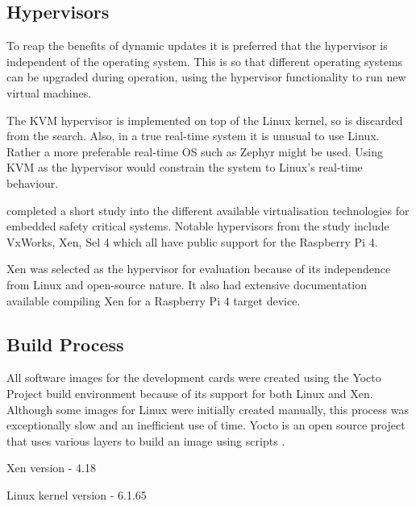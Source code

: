 \subsection{Hypervisors}

To reap the benefits of dynamic updates it is preferred that the hypervisor is independent of the operating system. This is so that different operating systems can be upgraded during operation, using the hypervisor functionality to run new virtual machines. 

The KVM hypervisor is implemented on top of the Linux kernel, so is discarded from the search. Also, in a true real-time system it is unusual to use Linux. Rather a more preferable real-time OS such as Zephyr might be used. Using KVM as the hypervisor would constrain the system to Linux's real-time behaviour.

\textcite{ayresVirtualisationMeansDynamic2019} completed a short study into the different available virtualisation technologies for embedded safety critical systems. Notable hypervisors from the study include VxWorks, Xen, Sel 4 which all have public support for the Raspberry Pi 4.

Xen was selected as the hypervisor for evaluation because of its independence from Linux and open-source nature. It also had extensive documentation available compiling Xen for a Raspberry Pi 4 target device.




\subsection{Build Process}

All software images for the development cards were created using the Yocto Project build environment because of its support for both Linux and Xen. Although some images for Linux were initially created manually, this process was exceptionally slow and an inefficient use of time. Yocto is an open source project that uses various layers to build an image using scripts \autocite{linuxfoundationYoctoProject2024}.

Xen version - 4.18

Linux kernel version - 6.1.65

